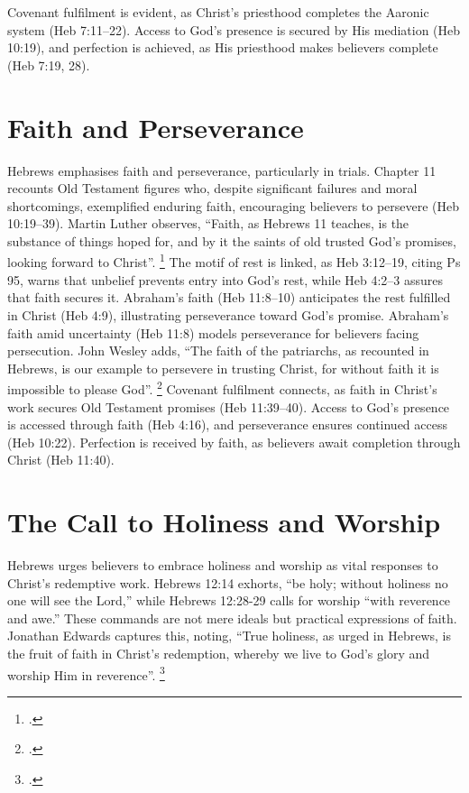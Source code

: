 \documentclass[12pt]{article}
\begin{document}
Covenant fulfilment is evident, as Christ’s priesthood completes the Aaronic
system (Heb 7:11--22). Access to God’s presence is secured by His mediation (Heb
10:19), and perfection is achieved, as His priesthood makes believers complete
(Heb 7:19, 28).

\section{Faith and Perseverance}
Hebrews emphasises faith and perseverance, particularly in trials.
%
Chapter 11 recounts Old Testament figures who, despite significant failures and
moral shortcomings, exemplified enduring faith, encouraging believers to
persevere (Heb 10:19--39).
%
Martin Luther observes, ``Faith, as Hebrews 11 teaches, is the substance of
things hoped for, and by it the saints of old trusted God’s promises, looking
forward to Christ''. \footcite[26]{Luther1968}
%
The motif of rest is linked, as Heb 3:12--19, citing Ps 95, warns that unbelief
prevents entry into God’s rest, while Heb 4:2--3 assures that faith secures it.
Abraham’s faith (Heb 11:8--10) anticipates the rest fulfilled in Christ (Heb
4:9), illustrating perseverance toward God’s promise.
%
Abraham’s faith amid uncertainty (Heb 11:8) models perseverance for believers
facing persecution.
%
John Wesley adds, ``The faith of the patriarchs, as recounted in Hebrews, is our
example to persevere in trusting Christ, for without faith it is impossible to
please God''. \footcite[Heb 11:6]{Wesley1755}
%
Covenant fulfilment connects, as faith in Christ’s work secures Old Testament
promises (Heb 11:39--40).
%
Access to God’s presence is accessed through faith (Heb 4:16), and perseverance
ensures continued access (Heb 10:22).
%
Perfection is received by faith, as believers await completion through Christ
(Heb 11:40).

\section{The Call to Holiness and Worship}
Hebrews urges believers to embrace holiness and worship as vital responses to
Christ’s redemptive work.
%
Hebrews 12:14 exhorts, ``be holy; without holiness no one will see the Lord,''
while Hebrews 12:28-29 calls for worship ``with reverence and awe.''
%
These commands are not mere ideals but practical expressions of faith.
%
Jonathan Edwards captures this, noting, ``True holiness, as urged in Hebrews, is
the fruit of faith in Christ’s redemption, whereby we live to God’s glory and
worship Him in reverence''. \footcite[2.3]{Edwards1959}
\end{document}
